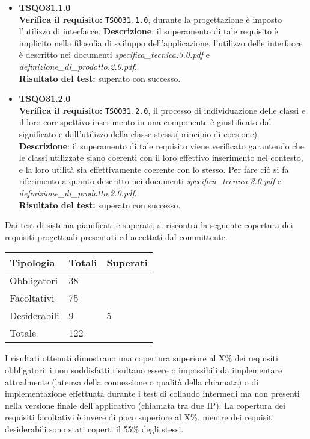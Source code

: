 \begin{itemize}
\item \textbf{TSQO31.1.0}\\
\textbf{Verifica il requisito:} \texttt{TSQO31.1.0}, durante la progettazione è imposto l'utilizzo di interfacce.
\textbf{Descrizione}: il superamento di tale requisito è implicito nella filosofia di sviluppo dell'applicazione, l'utilizzo delle interfacce è descritto nei documenti \textit{specifica\_tecnica.3.0.pdf} e \textit{definizione\_di\_prodotto.2.0.pdf}.\\
\textbf{Risultato del test:} superato con successo.

\item \textbf{TSQO31.2.0}\\
\textbf{Verifica il requisito:} \texttt{TSQO31.2.0}, il processo di individuazione delle classi e il loro corrispettivo inserimento in una componente è giustificato dal significato e dall'utilizzo della classe stessa(principio di coesione).
\textbf{Descrizione}: il superamento di tale requisito viene verificato garantendo che le classi utilizzate siano coerenti con il loro effettivo inserimento nel contesto, e la loro utilità sia effettivamente coerente con lo stesso. Per fare ciò si fa riferimento a quanto descritto nei documenti \textit{specifica\_tecnica.3.0.pdf} e \textit{definizione\_di\_prodotto.2.0.pdf}.\\
\textbf{Risultato del test:} superato con successo.

\end{itemize}

Dai test di sistema pianificati e superati, si riscontra la seguente copertura dei requisiti progettuali presentati ed accettati dal committente.

\begin{center}
\begin{longtable}{p{}ll}
\toprule Tipologia & Totali  & Superati\\
\midrule

Obbligatori & 38 &\\
Facoltativi & 75&\\
Desiderabili & 9 & 5\\
\bottomrule
Totale &122 &\\
\end{longtable}
\end{center}

I risultati ottenuti dimostrano una copertura superiore al X\% dei requisiti obbligatori, i non soddisfatti risultano essere o impossibili da implementare attualmente (latenza della connessione o qualità della chiamata) o di implementazione effettuata durante i test di collaudo intermedi ma non presenti nella versione finale dell'applicativo (chiamata tra due IP).
La copertura dei requisiti facoltativi è invece di poco superiore al X\%, mentre dei requisiti desiderabili sono stati coperti il 55\% degli stessi.



